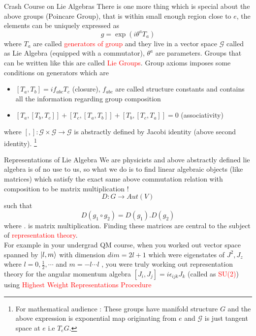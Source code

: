 \documentclass{beamer}
\begin{document}
\begin{frame}{Crash Course on Lie Algebras}
There is one more thing which is special about the above groups (Poincare Group), that is within small enough region close to $e$, the elements can be uniquely expressed as
\begin{equation}
    g = \exp(i \theta^{a}T_{a})
\end{equation} where $T_{a}$ are called \textcolor{red}{generators of group} and they live in a vector space $\mathcal{G}$ called as Lie Algebra (equipped with a commutator), $\theta^{a}$ are parameters. Groups that can be written like this are called \textcolor{red}{Lie Groups}. Group axioms imposes some conditions on generators which are
\begin{itemize}
    \item $[T_{a}, T_{b}] = if_{abc}T_{c}$ (closure), $f_{abc}$ are called structure constants and contains all the information regarding group composition
    \item $[T_{a}, [T_{b}, T_{c}]] + [T_{c}, [T_{a}, T_{b}]] + [T_{b}, [T_{c}, T_{a}]] = 0$ (associativity)
\end{itemize} where $[ , ]\colon \mathcal{G} \times \mathcal{G} \to \mathcal{G}$ is abstractly defined by Jacobi identity (above second identity).
\footnote{For mathematical audience : These groups have manifold structure $G$ and the above expression is exponential map originating from $e$ and $\mathcal{G}$ is just tangent space at $e$ i.e $T_{e}G$.}
\end{frame}
\begin{frame}{Representations of Lie Algebra}
We are physicists and above abstractly defined lie algebra is of no use to us, so what we do is to find linear algebraic objects (like matrices) which satisfy the exact same above commutation relation with composition to be matrix multiplication ! \\
\begin{equation}
    D\colon G\to Aut(V)
\end{equation} such that 
\begin{equation}
    D(g_{1}\circ g_{2}) = D(g_{1}).D(g_{2})
\end{equation} where $.$ is matrix multiplication.
Finding these matrices are central to the subject of \textcolor{red}{representation theory}. \\
\vspace{5mm}
For example in your undergrad QM course, when you worked out vector space spanned by $\ket{l, m}$ with dimension $dim = 2l+1 $ which were eigenstates of $J^{2}, J_{z}$ where $l=0, \frac{1}{2}, \cdots$ and $m = -l\cdots l $ , you were truly working out representation theory for the angular momentum algebra $[J_{i}, J_{j}] = i\epsilon_{ijk}J_{k}$ (called as \textcolor{red}{SU(2)}) using \textcolor{red}{Highest Weight Representations Procedure}
\end{frame}
\end{document}
